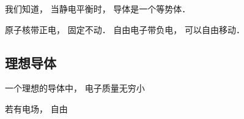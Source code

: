

我们知道， 当静电平衡时， 导体是一个等势体． 


原子核带正电， 固定不动． 自由电子带负电， 可以自由移动．

\subsection{理想导体}

一个理想的导体中， 电子质量无穷小

若有电场， 自由
